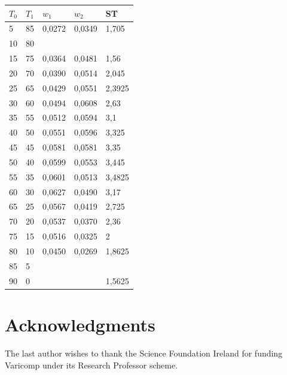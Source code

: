 \documentclass[journal]{new-aiaa}
\begin{document}
\begin{table}[]
	\begin{tabular}{lllll}
		\hline
		$T_0$ & $T_1$ & $w_1$       & $w_2$       & ST     \\
		\hline
		5  & 85 & 0,0272 & 0,0349 & 1,705  \\
		10 & 80 &        &        &        \\
		15 & 75 & 0,0364 & 0,0481 & 1,56   \\
		20 & 70 & 0,0390 & 0,0514 & 2,045  \\
		25 & 65 & 0,0429 & 0,0551 & 2,3925 \\
		30 & 60 & 0,0494 & 0,0608 & 2,63   \\
		35 & 55 & 0,0512 & 0,0594 & 3,1    \\
		40 & 50 & 0,0551 & 0,0596 & 3,325  \\
		45 & 45 & 0,0581 & 0,0581 & 3,35   \\
		50 & 40 & 0,0599 & 0,0553 & 3,445  \\
		55 & 35 & 0,0601 & 0,0513 & 3,4825 \\
		60 & 30 & 0,0627 & 0,0490 & 3,17   \\
		65 & 25 & 0,0567 & 0,0419 & 2,725  \\
		70 & 20 & 0,0537 & 0,0370 & 2,36   \\
		75 & 15 & 0,0516 & 0,0325 & 2      \\
		80 & 10 & 0,0450 & 0,0269 & 1,8625 \\
		85 & 5  &        &        &        \\
		90 & 0  &        &        & 1,5625\\
		\hline
	\end{tabular}
\end{table}
\section*{Acknowledgments}

The last author wishes to thank the Science Foundation Ireland for funding Varicomp under its Research Professor scheme.
\newpage


\end{document}

